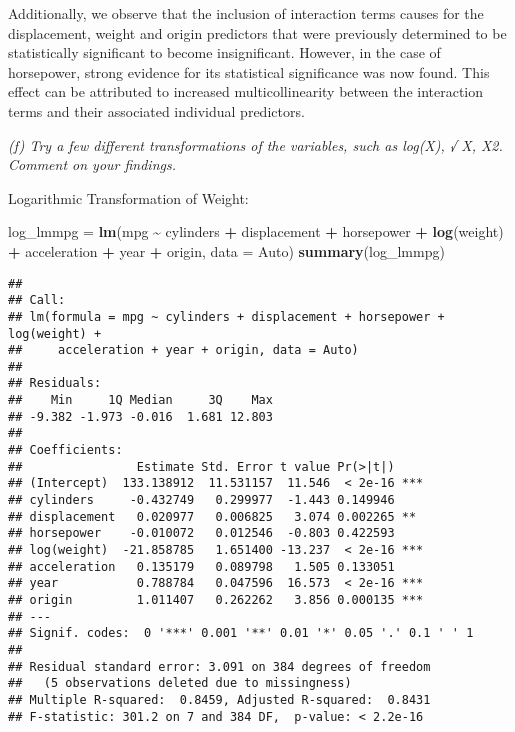 \documentclass[
]{article}
\newenvironment{Shaded}{\begin{snugshade}}{\end{snugshade}}
\newcommand{\AttributeTok}[1]{\textcolor[rgb]{0.13,0.29,0.53}{#1}}
\newcommand{\FunctionTok}[1]{\textcolor[rgb]{0.13,0.29,0.53}{\textbf{#1}}}
\newcommand{\NormalTok}[1]{#1}
\newcommand{\OtherTok}[1]{\textcolor[rgb]{0.56,0.35,0.01}{#1}}
\newcommand{\SpecialCharTok}[1]{\textcolor[rgb]{0.81,0.36,0.00}{\textbf{#1}}}
\begin{document}
Additionally, we observe that the inclusion of interaction terms causes
for the displacement, weight and origin predictors that were previously
determined to be statistically significant to become insignificant.
However, in the case of horsepower, strong evidence for its statistical
significance was now found. This effect can be attributed to increased
multicollinearity between the interaction terms and their associated
individual predictors.

\emph{(f) Try a few different transformations of the variables, such as
log(X), √ X, X2. Comment on your findings.}

Logarithmic Transformation of Weight:

\begin{Shaded}
\begin{Highlighting}[]
\NormalTok{log\_lmmpg }\OtherTok{=} \FunctionTok{lm}\NormalTok{(mpg }\SpecialCharTok{\textasciitilde{}}\NormalTok{ cylinders }\SpecialCharTok{+}\NormalTok{ displacement }\SpecialCharTok{+}\NormalTok{ horsepower }\SpecialCharTok{+} \FunctionTok{log}\NormalTok{(weight) }\SpecialCharTok{+}\NormalTok{ acceleration }\SpecialCharTok{+}\NormalTok{ year }\SpecialCharTok{+}\NormalTok{ origin, }\AttributeTok{data =}\NormalTok{ Auto)}
\FunctionTok{summary}\NormalTok{(log\_lmmpg)}
\end{Highlighting}
\end{Shaded}

\begin{verbatim}
## 
## Call:
## lm(formula = mpg ~ cylinders + displacement + horsepower + log(weight) + 
##     acceleration + year + origin, data = Auto)
## 
## Residuals:
##    Min     1Q Median     3Q    Max 
## -9.382 -1.973 -0.016  1.681 12.803 
## 
## Coefficients:
##                Estimate Std. Error t value Pr(>|t|)    
## (Intercept)  133.138912  11.531157  11.546  < 2e-16 ***
## cylinders     -0.432749   0.299977  -1.443 0.149946    
## displacement   0.020977   0.006825   3.074 0.002265 ** 
## horsepower    -0.010072   0.012546  -0.803 0.422593    
## log(weight)  -21.858785   1.651400 -13.237  < 2e-16 ***
## acceleration   0.135179   0.089798   1.505 0.133051    
## year           0.788784   0.047596  16.573  < 2e-16 ***
## origin         1.011407   0.262262   3.856 0.000135 ***
## ---
## Signif. codes:  0 '***' 0.001 '**' 0.01 '*' 0.05 '.' 0.1 ' ' 1
## 
## Residual standard error: 3.091 on 384 degrees of freedom
##   (5 observations deleted due to missingness)
## Multiple R-squared:  0.8459, Adjusted R-squared:  0.8431 
## F-statistic: 301.2 on 7 and 384 DF,  p-value: < 2.2e-16
\end{verbatim}
\end{document}
